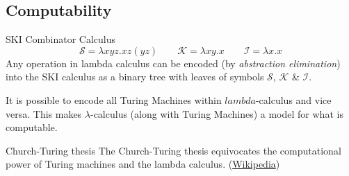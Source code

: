 \subsection{Computability}
\begin{definitionbox}{SKI Combinator Calculus}
    \[\mathcal{S}  = \lambda x y z . x z (y z)\qquad \mathcal{K} = \lambda xy.x \qquad \mathcal{I} = \lambda x . x\]
    Any operation in lambda calculus can be encoded (by \textit{abstraction elimination}) into the SKI calculus as a binary tree with leaves of symbols $\mathcal{S}$, $\mathcal{K}$ \& $\mathcal{I}$.
\end{definitionbox}

It is possible to encode all Turing Machines within $lambda$-calculus and vice versa. This makes $\lambda$-calculus (along with Turing Machines) a model for what is computable.
\begin{sidenotebox}{Church-Turing thesis}
    The Church-Turing thesis equivocates the computational power of Turing machines and the lambda calculus. (\href{https://en.wikipedia.org/wiki/Church%E2%80%93Turing_thesis}{Wikipedia})
\end{sidenotebox}

